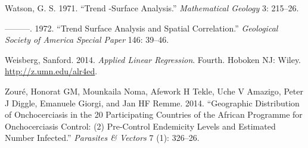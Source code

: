 \documentclass[
  letterpaper,
]{krantz}
\newlength{\cslhangindent}
\newlength{\cslentryspacingunit} %
\newenvironment{CSLReferences}[2] %
 {%
  \setlength{\parindent}{0pt}
  \ifodd #1
  \let\oldpar\par
  \def\par{\hangindent=\cslhangindent\oldpar}
  \fi
  \setlength{\parskip}{#2\cslentryspacingunit}
 }%
 {}
\begin{document}
\begin{CSLReferences}{1}{0}
\leavevmode{}%
Watson, G. S. 1971. {``Trend -Surface Analysis.''} \emph{Mathematical
Geology} 3: 215--26.

\leavevmode{}%
---------. 1972. {``Trend Surface Analysis and Spatial Correlation.''}
\emph{Geological Society of America Special Paper} 146: 39--46.

\leavevmode{}%
Weisberg, Sanford. 2014. \emph{Applied Linear Regression}. Fourth.
Hoboken {NJ}: Wiley. \url{http://z.umn.edu/alr4ed}.

\leavevmode{}%
Zouré, Honorat GM, Mounkaila Noma, Afework H Tekle, Uche V Amazigo,
Peter J Diggle, Emanuele Giorgi, and Jan HF Remme. 2014. {``Geographic
Distribution of Onchocerciasis in the 20 Participating Countries of the
African Programme for Onchocerciasis Control: (2) Pre-Control Endemicity
Levels and Estimated Number Infected.''} \emph{Parasites \& Vectors} 7
(1): 326--26.

\end{CSLReferences}
\end{document}

